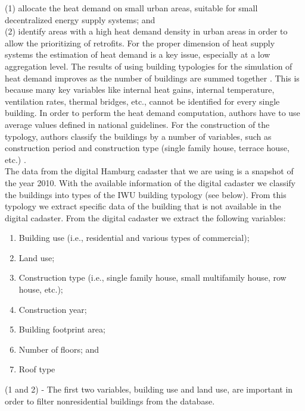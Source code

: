 \documentclass[11pt]{IJM-article}
\begin{document}
(1) allocate the heat demand on small urban areas, suitable for small
decentralized energy supply systems; and\\

(2) identify areas with a high heat demand density in urban areas in order to
allow the prioritizing of retrofits. For the proper dimension of heat supply
systems the estimation of heat demand is a key issue, especially at a low
aggregation level. The results of using building typologies for the simulation
of heat demand improves as the number of buildings are summed together
.  This is because many key variables like internal heat
gains, internal temperature, ventilation rates, thermal bridges, etc., cannot
be identified for every single building.  In order to perform the heat demand
computation, authors have to use average values defined in national guidelines.
For the construction of the typology, authors classify the buildings by a
number of variables, such as construction period and construction type (single
family house, terrace house, etc.) .\\

The data from the digital Hamburg cadaster that we are using is a snapshot of
the year 2010.  With the available information of the digital cadaster we
classify the buildings into types of the IWU building typology (see below).
From this typology we extract specific data of the building that is not
available in the digital cadaster. From the digital cadaster we extract the
following variables:\\

\begin{enumerate}
    \item Building use (i.e., residential and various types of commercial);
    \item Land use;
    \item Construction type (i.e., single family house, small multifamily
        house, row house, etc.);
    \item Construction year;
    \item Building footprint area;
    \item Number of floors; and
    \item Roof type
\end{enumerate}\pb

(1 and 2) - The first two variables, building use and land use, are important
in order to filter nonresidential buildings from the database.\\
\end{document}
